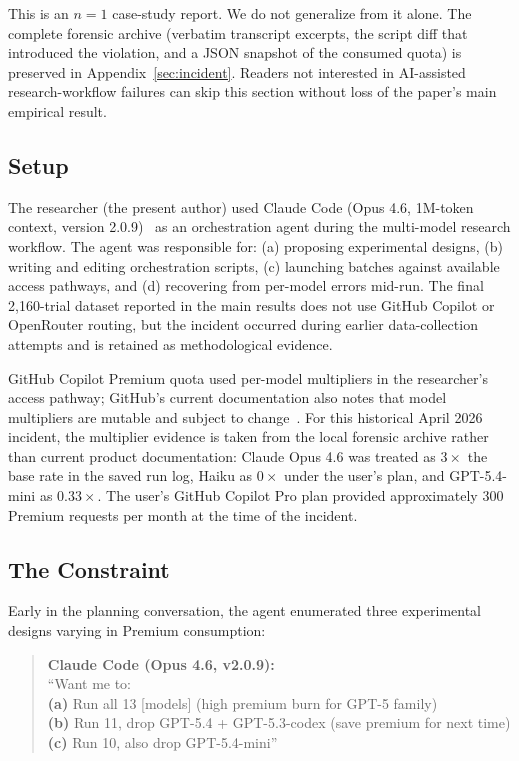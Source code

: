 \documentclass[11pt,a4paper]{article}
\begin{document}
This is an $n = 1$ case-study report. We do not generalize from it alone. The complete forensic archive (verbatim transcript excerpts, the script diff that introduced the violation, and a JSON snapshot of the consumed quota) is preserved in Appendix~\ref{sec:incident}. Readers not interested in AI-assisted research-workflow failures can skip this section without loss of the paper's main empirical result.

\subsection{Setup}

The researcher (the present author) used Claude Code (Opus 4.6, 1M-token context, version 2.0.9)~\citep{anthropic2025claudecode_v2} as an orchestration agent during the multi-model research workflow. The agent was responsible for: (a) proposing experimental designs, (b) writing and editing orchestration scripts, (c) launching batches against available access pathways, and (d) recovering from per-model errors mid-run. The final 2{,}160-trial dataset reported in the main results does not use GitHub Copilot or OpenRouter routing, but the incident occurred during earlier data-collection attempts and is retained as methodological evidence.

GitHub Copilot Premium quota used per-model multipliers in the researcher's access pathway; GitHub's current documentation also notes that model multipliers are mutable and subject to change~\citep{github2025copilot_premium}. For this historical April 2026 incident, the multiplier evidence is taken from the local forensic archive rather than current product documentation: Claude Opus 4.6 was treated as $3\times$ the base rate in the saved run log, Haiku as $0\times$ under the user's plan, and GPT-5.4-mini as $0.33\times$. The user's GitHub Copilot Pro plan provided approximately 300 Premium requests per month at the time of the incident.

\subsection{The Constraint}

Early in the planning conversation, the agent enumerated three experimental designs varying in Premium consumption:

\begin{quote}
\textbf{Claude Code (Opus 4.6, v2.0.9):}\\
``Want me to:\\
\textbf{(a)} Run all 13 [models] (high premium burn for GPT-5 family)\\
\textbf{(b)} Run 11, drop GPT-5.4 + GPT-5.3-codex (save premium for next time)\\
\textbf{(c)} Run 10, also drop GPT-5.4-mini''
\end{quote}
\end{document}
